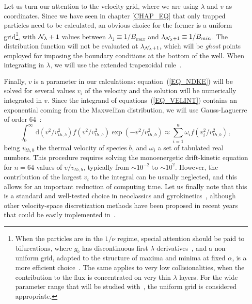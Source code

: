 Let us turn our attention to the velocity grid, where we are using $\lambda$ and $v$ as coordinates. Since we have seen in chapter \ref{CHAP_EQ} that only trapped particles need to be calculated, an obvious choice for the former is a uniform grid\footnote{When the particles are in the $1/\nu$ regime, special attention should be paid to bifurcations, where $g_b$ has discontinuous first $\lambda$-derivatives~\citep{nemov1999neo,calvo2014er}, and a non-uniform grid, adapted to the structure of maxima and minima at fixed $\alpha$, is a more efficient choice~\citep{kernbichler2016neo2}. The same applies to very low collisionalities, when the contribution to the flux is concentrated on very thin $\lambda$ layers. For the wide parameter range that will be studied with~\KNOSOS, the uniform grid is considered appropriate.}, with ${\cal{N}}_\lambda+1$ values between $\lambda_1\equiv 1/B_{max}$ and $\lambda_{{\cal{N}}_\lambda+1}\equiv 1/B_{min}$. The distribution function will not be evaluated at $\lambda_{{\cal{N}}_\lambda+1}$, which will be \textit{ghost} points employed for imposing the boundary conditions at the bottom of the well. When integrating in $\lambda$, we will use the extended trapezoidal rule~\citep[][]{numericalrecipes}.

Finally, $v$ is a parameter in our calculations: equation~(\ref{EQ_NDKE}) will be solved for several values $v_i$ of the velocity and the solution will be numerically integrated in $v$. Since the integrand of equations~(\ref{EQ_VELINT}) contains an exponential coming from the Maxwellian distribution, we will use Gauss-Laguerre of order 64~\citep[][]{numericalrecipes}:
\begin{equation}
\int_0^\infty\,\mathrm{d}(v^2/v_{th,b}^2) f(v^2/v_{th,b}^2) \exp{(-v^2/v^2_{th,b})} \approx \sum_{i=1}^{n} \omega_i f(v_i^2/v_{th,b}^2)\,,
\label{EQ_CONV}
\end{equation}
being $v_{th,b}$ the thermal velocity of species $b$, and $\omega_i$ a set of tabulated real numbers. This procedure requires solving the monoenergetic drift-kinetic equation for $n=64$ values of $v/v_{th,b}$, typically from $\sim 10^{-2}$ to $\sim 10^2$. However, the contribution of the largest $v_i$ to the integral can be usually neglected, and this allows for an important reduction of computing time. Let us finally note that this is a standard and well-tested choice in neoclassics and gyrokinetics~\citep[e.g.][]{velasco2011bootstrap,barnes2019stella}, although other velocity-space discretization methods have been proposed in recent years~\citep{landreman2013intv} that could be easily implemented in~\KNOSOS.

